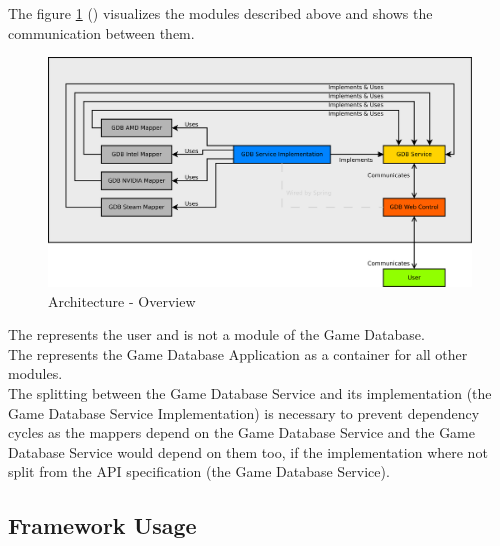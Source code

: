 \documentclass[12pt]{scrreprt}
\begin{document}
				The figure \ref{fig:architecture_overview} () visualizes the modules described above and shows the communication between them.
				\begin{figure}[H]
					\label{fig:architecture_overview}
					\centering
					\includegraphics[width=\textwidth]{images/architecture/overview.png}
					\caption{Architecture - Overview}
				\end{figure}

				The  represents the user and is not a module of the Game Database.
				\\
				The  represents the Game Database Application as a container for all other modules.
				\\

				The splitting between the Game Database Service and its implementation (the Game Database Service Implementation) is necessary to prevent dependency cycles as the mappers depend on the Game Database Service and the Game Database Service would depend on them too, if the implementation where not split from the API specification (the Game Database Service).

			\subsection{Framework Usage}
				\label{subsec:tb-concept_technical_framework-usage}
\end{document}
